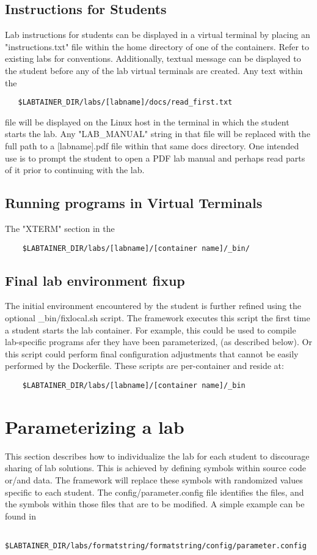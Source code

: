 \documentclass{article}
\begin{document}
\subsection {Instructions for Students}
Lab instructions for students can be displayed in a virtual terminal by placing an
"instructions.txt" file within the home directory of one of the containers.  Refer to existing
labs for conventions.  Additionally, textual message can be displayed to the student before any 
of the lab virtual terminals are created.  Any text within the 
\begin{verbatim}
   $LABTAINER_DIR/labs/[labname]/docs/read_first.txt
\end{verbatim}
\noindent file will be displayed on the Linux host in the terminal in which the student
starts the lab.  Any "LAB\_MANUAL" string in that file will be replaced with the full path
to a [labname].pdf file within that same docs directory.  One intended use is to prompt the
student to open a PDF lab manual and perhaps read parts of it prior to continuing with the lab.

\subsection {Running programs in Virtual Terminals}
The "XTERM" section in the 
\begin{verbatim}
    $LABTAINER_DIR/labs/[labname]/[container name]/_bin/
\end{verbatim}

\subsection{Final lab environment fixup}
The initial environment encountered by the student is further refined using
the optional \_bin/fixlocal.sh script.  The framework executes
this script the first time a student starts the lab container.  For example,
this could be used to compile lab-specific programs afer they have been parameterized,
(as described below).  Or this script could perform final configuration adjustments
that cannot be easily performed by the Dockerfile.  These scripts are per-container
and reside at:
\begin{verbatim}
    $LABTAINER_DIR/labs/[labname]/[container name]/_bin
\end{verbatim}

\section{Parameterizing a lab}
This section describes how to individualize the lab for each student to discourage
sharing of lab solutions.  This is achieved by defining symbols within source 
code or/and data.  The framework will replace these symbols with randomized values
specific to each student.  The config/parameter.config file identifies the files, and
the symbols within those files that are to be modified.  A simple example can be found in 
\begin{verbatim}
    $LABTAINER_DIR/labs/formatstring/formatstring/config/parameter.config
\end{verbatim}
\end{document}
